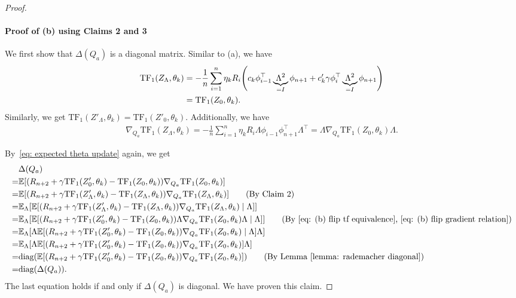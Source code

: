 \documentclass{article}
\newcommand{\explain}[1]{\tag*{(#1)}}
\newcommand{\E}{\mathbb{E}}
\newcommand{\tf}{\text{TF}}
\newcommand{\diag}{\text{diag}}
\begin{document}
\begin{proof}
\paragraph{Proof of (b) using Claims 2 and 3} 
We first show that $\Delta (Q_a)$ is a diagonal matrix. 
Similar to (a), we have
\begin{align}
\label{eq: (b) flip tf equivalence}
    \tf_1(Z_\Lambda,\theta_k) 
    &= -\frac{1}{n}\sum_{i=1}^n  \eta_k R_i \qty(c_k  \phi_{i-1}^\top \underbrace{\Lambda^2}_{= I} \phi_{n+1} + c_k' \gamma  \phi_{i}^\top \underbrace{\Lambda^2}_{= I} \phi_{n+1})\\ 
    &= \tf_1(Z_0,\theta_k).
\end{align}
Similarly, we get $\tf_1(Z'_\Lambda,\theta_k) = \tf_1(Z'_0,\theta_k)$.
Additionally, we have
\begin{align}
\label{eq: (b) flip gradient relation}
    \nabla_{Q_a} \tf_1(Z_\Lambda,\theta_k) 
    = -\frac{1}{n}\sum_{i=1}^n \eta_k R_i  \Lambda \phi_{i-1} \phi_{n+1}^\top  \Lambda^\top 
    = \Lambda \nabla_{Q_a} \tf_1(Z_0, \theta_k) \Lambda.
\end{align}

By~\eqref{eq: expected theta update} again, we get
\begin{align}
     & \Delta(Q_a)\\
    =& \E\qty[(R_{n+2} + \gamma \tf_1(Z'_0, \theta_k) - \tf_1(Z_0, \theta_k))\nabla_{Q_a}\tf_1(Z_0, \theta_k)]\\
    =& \E\qty[(R_{n+2} + \gamma \tf_1(Z'_\Lambda, \theta_k) - \tf_1(Z_\Lambda, \theta_k))\nabla_{Q_a} \tf_1(Z_\Lambda, \theta_k)]\explain{By Claim 2}\\
    =& \E_\Lambda\qty[\E\qty[(R_{n+2} + \gamma \tf_1(Z'_\Lambda, \theta_k) - \tf_1(Z_\Lambda, \theta_k))\nabla_{Q_a}\tf_1(Z_\Lambda, \theta_k) \mid \Lambda]]\\
    =& \E_\Lambda\qty[\E\qty[(R_{n+2} + \gamma \tf_1(Z'_0, \theta_k) - \tf_1(Z_0, \theta_k))\Lambda \nabla_{Q_a}\tf_1(Z_0, \theta_k)\Lambda \mid \Lambda]] \explain{By \eqref{eq: (b) flip tf equivalence}, \eqref{eq: (b) flip gradient relation}}\\
    =& \E_\Lambda\qty[\Lambda \E\qty[(R_{n+2} + \gamma \tf_1(Z'_0, \theta_k) - \tf_1(Z_0, \theta_k)) \nabla_{Q_a}\tf_1(Z_0, \theta_k) \mid \Lambda]\Lambda]\\
    =& \E_\Lambda\qty[\Lambda \E\qty[(R_{n+2} + \gamma \tf_1(Z'_0, \theta_k) - \tf_1(Z_0, \theta_k)) \nabla_{Q_a}\tf_1(Z_0, \theta_k)]\Lambda]\\
    =& \diag\qty(\E\qty[(R_{n+2} + \gamma \tf_1(Z'_0, \theta_k) - \tf_1(Z_0, \theta_k))\nabla_{Q_a}\tf_1(Z_0, \theta_k)])\explain{By Lemma~\ref{lemma: rademacher diagonal}}\\
    =& \diag(\Delta(Q_a)) \label{eq: delta Q diag}.
\end{align}
The last equation holds if and only if $\Delta(Q_a)$ is diagonal.
We have proven this claim.


\end{proof}
\end{document}
